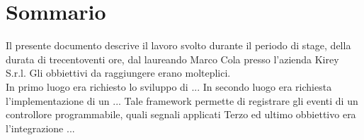 \cleardoublepage
{}
{}
\begingroup
\let\clearpage\relax
\let\cleardoublepage\relax
\let\cleardoublepage\relax

\chapter*{Sommario}

Il presente documento descrive il lavoro svolto durante il periodo di stage, della durata di trecentoventi ore, dal laureando Marco Cola presso l'azienda Kirey S.r.l.
Gli obbiettivi da raggiungere erano molteplici.\\
In primo luogo era richiesto lo sviluppo di ...
In secondo luogo era richiesta l'implementazione di un ...
Tale framework permette di registrare gli eventi di un controllore programmabile, quali segnali applicati
Terzo ed ultimo obbiettivo era l'integrazione ...




\endgroup

\vfill
